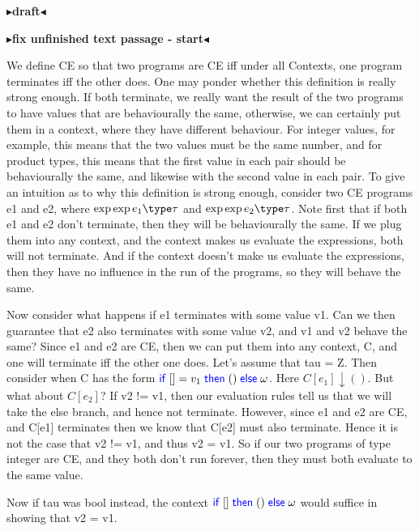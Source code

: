 \documentclass[twoside,11pt,openright]{report}
\newcommand{\Keyword}[1]{{\color{blue} \mathsf{#1}}}
\newcommand{\expr}{e}
\newcommand{\val}{v}
\newcommand{\TT}{()}
\newcommand{\IfCmd}{\Keyword{if}}
\newcommand{\ThenCmd}{\Keyword{then}}
\newcommand{\ElseCmd}{\Keyword{else}}
\def\If#1then#2else#3{\IfCmd{}\;#1\;\ThenCmd{}\;#2\;\ElseCmd{}\;#3}
\newcommand{\typ}{\tau}
\def\envs#1#2\exp#3\type#4{#1 \; | \; #2 \; \vdash #3 : #4}
\newcommand{\todo}[1]{{\color[rgb]{.5,0,0}\textbf{$\blacktriangleright$#1$\blacktriangleleft$}}}
\begin{document}
\todo{draft}




\todo{fix unfinished text passage - start}

We define CE so that two programs are CE iff under all Contexts,
one program terminates iff the other does.
One may ponder whether this definition is really strong enough.
If both terminate, we really want the result of the two programs to have
values that are behaviourally the same, otherwise, we can certainly 
put them in a context, where they have different behaviour.
For integer values, for example, this means that the two values
must be the same number, and for product types, this means that
the first value in each pair should be behaviourally the same, and
likewise with the second value in each pair.
To give an intuition as to  why this definition is strong enough, 
consider two CE programs e1 and e2, where $\envs \cdot \cdot \exp \expr_1 \type \typ$ and $\envs \cdot \cdot \exp \expr_2 \type \typ$.
Note first that if both e1 and e2 don't terminate, then they will be
behaviourally the same. If we plug them into any context, and the context
makes us evaluate the expressions, both will not terminate. And if the
context doesn't make us evaluate the expressions, then they have no
influence in the run of the programs, so they will behave the same.

Now consider what happens if e1 terminates with some value v1.
Can we then guarantee that e2 also terminates with some value v2,
and v1 and v2 behave the same?
Since e1 and e2 are CE, then we can put them into any context, C, and
one will terminate iff the other one does.
Let's assume that tau = Z. Then consider when
C has the form $\If [] = \val_1 then \TT else \omega$.
Here $C[\expr_1] \downarrow \TT$. But what about $C[\expr_2]$? If v2 != v1, then
our evaluation rules tell us that we will take the else branch, and
hence not terminate. However, since e1 and e2 are CE, and C[e1] terminates
then we know that C[e2] must also terminate. Hence it is not the case that
v2 != v1, and thus v2 = v1. So if our two programs of type integer are CE, and they both don't run forever, then they must both evaluate to the same value.

Now if tau was bool instead, the context $\If [] then \TT else \omega$
would suffice in showing that v2 = v1. 
\end{document}
